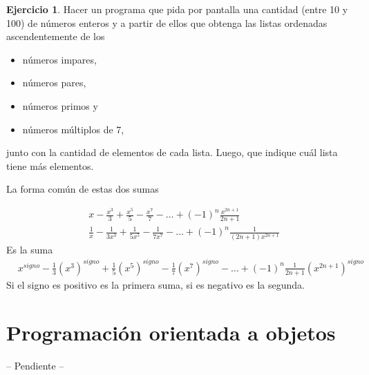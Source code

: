 \documentclass[12pt]{article}
\theoremstyle{definition}
\newtheorem{exercise}{Ejercicio}[section]
\begin{document}
    \begin{exercise}
        Hacer un programa que pida por pantalla una cantidad (entre 10 y 100) de números enteros y a partir de ellos
        que obtenga las listas ordenadas ascendentemente de los
        \begin{itemize}
            \item números impares,
            \item números pares,
            \item números primos y
            \item números múltiplos de 7,
        \end{itemize}
        junto con la cantidad de elementos de cada lista.
        Luego, que indique cuál lista tiene más elementos.
    \end{exercise}


    La forma común de estas dos sumas

    \begin{align*}
        &x - \frac{x^3}{3} + \frac{x^5}{5} - \frac{x^7}{7} - \ldots + (-1)^n \frac{x^{2n + 1}}{2n + 1}\\[5mm]
        &\frac{1}{x} - \frac{1}{3 x^3} + \frac{1}{5 x^5} - \frac{1}{7 x^7} - \ldots + (-1)^n \frac{1}{(2n + 1)x^{2n + 1}}
    \end{align*}
    Es la suma
    \begin{align*}
        &x^{signo} - \frac{1}{3} (x^3)^{signo} + \frac{1}{5} (x^5)^{signo} - \frac{1}{7} (x^7)^{signo} - \ldots + (-1)^n \frac{1}{2n + 1} (x^{2n + 1})^{signo}
    \end{align*}
    Si el signo es positivo es la primera suma, si es negativo es la segunda.


    \newpage
    \section{Programación orientada a objetos}
    -- Pendiente --
\end{document}
